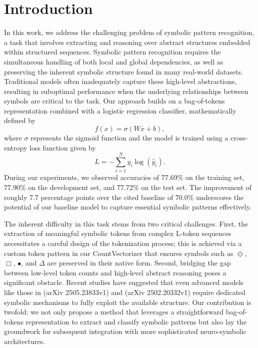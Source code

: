 \documentclass{article}
\begin{document}
\section{Introduction}
In this work, we address the challenging problem of symbolic pattern recognition, a task that involves extracting and reasoning over abstract structures embedded within structured sequences. Symbolic pattern recognition requires the simultaneous handling of both local and global dependencies, as well as preserving the inherent symbolic structure found in many real-world datasets. Traditional models often inadequately capture these high-level abstractions, resulting in suboptimal performance when the underlying relationships between symbols are critical to the task. Our approach builds on a bag-of-tokens representation combined with a logistic regression classifier, mathematically defined by 
\[
f(x) = \sigma(Wx + b),
\]
where \(\sigma\) represents the sigmoid function and the model is trained using a cross-entropy loss function given by 
\[
L = -\sum_{i=1}^{N} y_i \log(\hat{y}_i).
\]
During our experiments, we observed accuracies of 77.69\% on the training set, 77.90\% on the development set, and 77.72\% on the test set. The improvement of roughly 7.7 percentage points over the cited baseline of 70.0\% underscores the potential of our baseline model to capture essential symbolic patterns effectively.

The inherent difficulty in this task stems from two critical challenges. First, the extraction of meaningful symbolic tokens from complex L-token sequences necessitates a careful design of the tokenization process; this is achieved via a custom token pattern in our CountVectorizer that ensures symbols such as \(\Diamond\), \(\Box\), \(\bullet\), and \(\Delta\) are preserved in their native form. Second, bridging the gap between low-level token counts and high-level abstract reasoning poses a significant obstacle. Recent studies have suggested that even advanced models like those in (arXiv 2505.23833v1) and (arXiv 2502.20332v1) require dedicated symbolic mechanisms to fully exploit the available structure. Our contribution is twofold: we not only propose a method that leverages a straightforward bag-of-tokens representation to extract and classify symbolic patterns but also lay the groundwork for subsequent integration with more sophisticated neuro-symbolic architectures.
\end{document}
